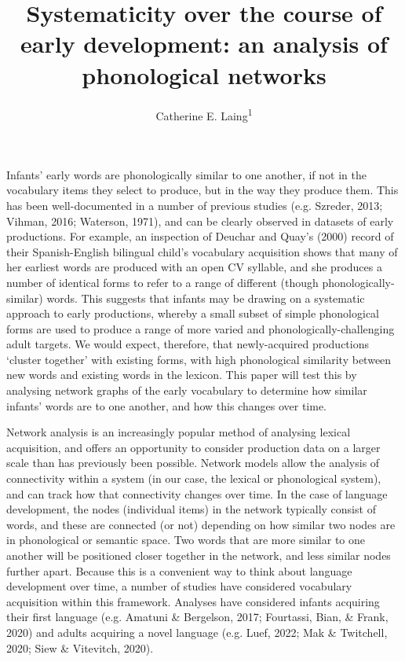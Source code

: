 \documentclass[
  man]{apa6}
\title{Systematicity over the course of early development: an analysis of phonological networks}
\author{Catherine E. Laing\textsuperscript{1}}
\date{}
\affiliation{\vspace{0.5cm}\textsuperscript{1} University of York, York, UK}
\begin{document}
\maketitle

Infants' early words are phonologically similar to one another, if not in the vocabulary items they select to produce, but in the way they produce them. This has been well-documented in a number of previous studies (e.g. Szreder, 2013; Vihman, 2016; Waterson, 1971), and can be clearly observed in datasets of early productions. For example, an inspection of Deuchar and Quay's (2000) record of their Spanish-English bilingual child's vocabulary acquisition shows that many of her earliest words are produced with an open CV syllable, and she produces a number of identical forms to refer to a range of different (though phonologically-similar) words. This suggests that infants may be drawing on a systematic approach to early productions, whereby a small subset of simple phonological forms are used to produce a range of more varied and phonologically-challenging adult targets. We would expect, therefore, that newly-acquired productions `cluster together' with existing forms, with high phonological similarity between new words and existing words in the lexicon. This paper will test this by analysing network graphs of the early vocabulary to determine how similar infants' words are to one another, and how this changes over time.

Network analysis is an increasingly popular method of analysing lexical acquisition, and offers an opportunity to consider production data on a larger scale than has previously been possible. Network models allow the analysis of connectivity within a system (in our case, the lexical or phonological system), and can track how that connectivity changes over time. In the case of language development, the nodes (individual items) in the network typically consist of words, and these are connected (or not) depending on how similar two nodes are in phonological or semantic space. Two words that are more similar to one another will be positioned closer together in the network, and less similar nodes further apart. Because this is a convenient way to think about language development over time, a number of studies have considered vocabulary acquisition within this framework. Analyses have considered infants acquiring their first language (e.g. Amatuni \& Bergelson, 2017; Fourtassi, Bian, \& Frank, 2020) and adults acquiring a novel language (e.g. Luef, 2022; Mak \& Twitchell, 2020; Siew \& Vitevitch, 2020).
\end{document}
